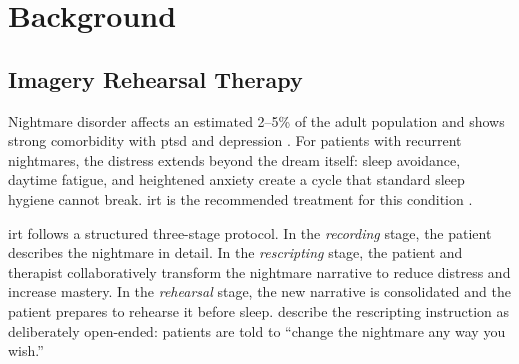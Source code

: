 \chapter{Background}
\label{chap:background}


\section{Imagery Rehearsal Therapy}
\label{sec:bg-irt}
%
%
%

Nightmare disorder affects an estimated 2--5\% of the adult population
\parencite{YPHMANIU,HM68TTLK,Q24CN9LD} and shows strong comorbidity
with \gls{ptsd} and depression \parencite{34M7Y3F8}. For patients with recurrent nightmares, the distress
extends beyond the dream itself: sleep avoidance, daytime fatigue, and
heightened anxiety create a cycle that standard sleep hygiene cannot break.
\gls{irt} is the recommended treatment for this condition
\parencite{34M7Y3F8, FGA5H3ZD}.

\gls{irt} follows a structured three-stage protocol. In the \emph{recording}
stage, the patient describes the nightmare in detail. In the \emph{rescripting}
stage, the patient and therapist collaboratively transform the nightmare
narrative to reduce distress and increase mastery. In the
\emph{rehearsal} stage, the new narrative is consolidated and the patient
prepares to rehearse it before sleep.
\textcite{FGA5H3ZD} describe the rescripting instruction as deliberately
open-ended: patients are told to ``change the nightmare any way you wish.''

